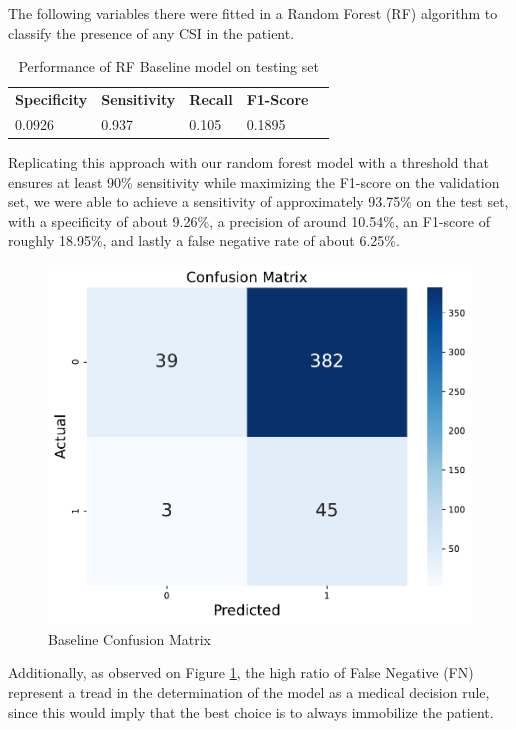 \documentclass[10pt,letterpaper]{article}
\begin{document}
The following variables there were fitted in a Random Forest (RF) algorithm to classify the presence of any CSI in the patient. 

\begin{table}[H]
\centering
\footnotesize
\begin{tabular}{lllll}
\toprule
\textbf{Specificity} & \textbf{Sensitivity} & \textbf{Recall} &  \textbf{F1-Score}\\
0.0926 & 0.937  & 0.105 & 0.1895  \\
\bottomrule
\end{tabular}
\caption{Performance of RF Baseline model on testing set}%
\label{tab:svm_results}
\end{table}

Replicating this approach with our random forest model with a threshold that ensures at least 90\% sensitivity while maximizing the F1-score on the validation set, we were able to achieve a sensitivity of approximately 93.75\% on the test set, with a specificity of about 9.26\%, a precision of around 10.54\%, an F1-score of roughly 18.95\%, and lastly a false negative rate of about 6.25\%.

\begin{figure}[H]
    \centering
    \includegraphics[width=0.5\linewidth]{plots/confusion_matrix_baseline.pdf}
    \caption{Baseline Confusion Matrix}
    \label{fig:confusion-baseline}
\end{figure}

Additionally, as observed on Figure \ref{fig:confusion-baseline}, the high ratio of False Negative (FN) represent a tread in the determination of the model as a medical decision rule, since this would imply that the best choice is to always immobilize the patient. 
\end{document}
